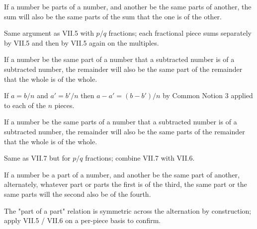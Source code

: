 \documentclass{rrxiv}
\begin{document}
\begin{claim}
\label{prop:VII.6}
If a number be parts of a number, and another be the same parts of
another, the sum will also be the same parts of the sum that the one
is of the other.
\end{claim}
\begin{evidence}
\label{ev:VII.6}
Same argument as VII.5 with $p/q$ fractions; each fractional piece
sums separately by VII.5 and then by VII.5 again on the multiples.
\end{evidence}

\begin{claim}
\label{prop:VII.7}
If a number be the same part of a number that a subtracted number is
of a subtracted number, the remainder will also be the same part of
the remainder that the whole is of the whole.
\end{claim}
\begin{evidence}
\label{ev:VII.7}
If $a = b/n$ and $a' = b'/n$ then $a - a' = (b - b')/n$ by Common
Notion 3 applied to each of the $n$ pieces.
\end{evidence}

\begin{claim}
\label{prop:VII.8}
If a number be the same parts of a number that a subtracted number
is of a subtracted number, the remainder will also be the same parts
of the remainder that the whole is of the whole.
\end{claim}
\begin{evidence}
\label{ev:VII.8}
Same as VII.7 but for $p/q$ fractions; combine VII.7 with VII.6.
\end{evidence}

\begin{claim}
\label{prop:VII.9}
If a number be a part of a number, and another be the same part of
another, alternately, whatever part or parts the first is of the
third, the same part or the same parts will the second also be of
the fourth.
\end{claim}
\begin{evidence}
\label{ev:VII.9}
The "part of a part" relation is symmetric across the alternation by
construction; apply VII.5 / VII.6 on a per-piece basis to confirm.
\end{evidence}
\end{document}
